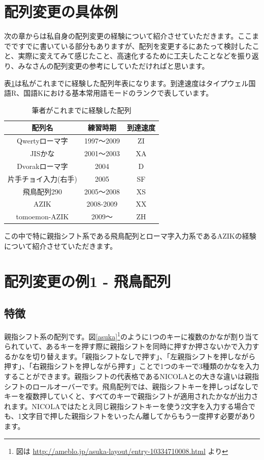 \section*{配列変更の具体例}

次の章からは私自身の配列変更の経験について紹介させていただきます。ここまでですでに書いている部分もありますが、配列を変更するにあたって検討したこと、実際に変えてみて感じたこと、高速化するために工夫したことなどを振り返り、みなさんの配列変更の参考にしていただければと思います。

表\ref{tomoemon:history}は私がこれまでに経験した配列年表になります。到達速度はタイプウェル国語R、国語Kにおける基本常用語モードのランクで表しています。
\begin{table}
\begin{center}
\caption{筆者がこれまでに経験した配列}
\label{tomoemon:history}
\begin{tabular}{ccc}
\hline
配列名 & 練習時期 & 到達速度 \\
\hline
Qwertyローマ字 & 1997～2009 & ZI \\
JISかな & 2001～2003 & XA \\
Dvorakローマ字 & 2004 & D \\
片手チョイ入力(右手) & 2005 & SF \\
飛鳥配列290 & 2005～2008 & XS \\
AZIK & 2008-2009 & XX \\
tomoemon-AZIK\footnotemark & 2009～ & ZH \\
\hline
\end{tabular}
\end{center}
\end{table}
この中で特に親指シフト系である飛鳥配列とローマ字入力系であるAZIKの経験について紹介させていただきます。

\section{配列変更の例1 - 飛鳥配列}

\subsection{特徴}

親指シフト系の配列です。図\ref{asuka}\footnote{図は \url{http://ameblo.jp/asuka-layout/entry-10334710008.html} より}のように1つのキーに複数のかなが割り当てられていて、あるキーを押す際に親指シフトを同時に押すか押さないかで入力するかなを切り替えます。「親指シフトなしで押す」、「左親指シフトを押しながら押す」、「右親指シフトを押しながら押す」ことで1つのキーで3種類のかなを入力することができます。親指シフトの代表格であるNICOLAとの大きな違いは親指シフトのロールオーバーです。飛鳥配列では、親指シフトキーを押しっぱなしでキーを複数押していくと、すべてのキーで親指シフトが適用されたかなが出力されます。NICOLAではたとえ同じ親指シフトキーを使う2文字を入力する場合でも、1文字目で押した親指シフトをいったん離してからもう一度押す必要があります。


